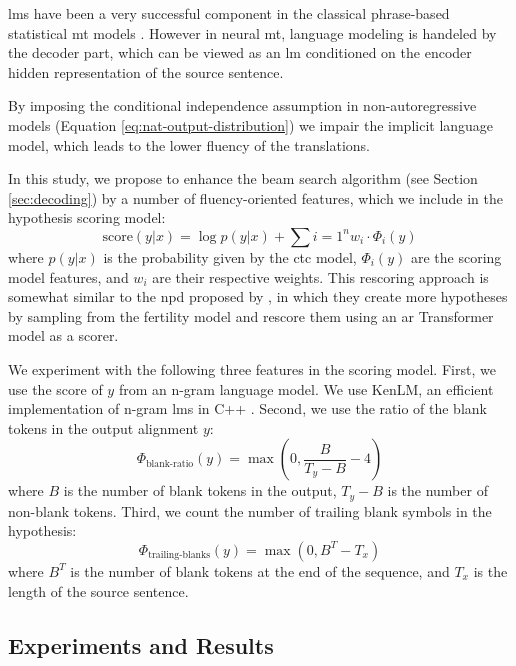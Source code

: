\Acp{lm} have been a very successful component in the classical phrase-based
statistical \acs{mt} models \citep{koehn2009statistical}. However in neural
\acs{mt}, language modeling is handeled by the decoder part, which can be
viewed as an \acs{lm} conditioned on the encoder hidden representation of the
source sentence.

By imposing the conditional independence assumption in non-autoregressive
models (Equation \ref{eq:nat-output-distribution}) we impair the implicit
language model, which leads to the lower fluency of the translations.

In this study, we propose to enhance the beam search algorithm (see Section
\ref{sec:decoding}) by a number of fluency-oriented features, which we include
in the hypothesis scoring model:
%
\begin{equation}
  \text{score}(y|x) = \log p(y|x) + \sum{i=1}^n w_i \cdot \Phi_i(y)
\end{equation}
%
where $p(y|x)$ is the probability given by the \acs{ctc} model, $\Phi_i(y)$ are
the scoring model features, and $w_i$ are their respective weights. This
rescoring approach is somewhat similar to the \ac{npd} proposed by
\citet{gu2017nonautoregressive}, in which they create more hypotheses by
sampling from the fertility model and rescore them using an \ac{ar} Transformer
model as a scorer.

We experiment with the following three features in the scoring model. First, we
use the score of $y$ from an n-gram language model. We use KenLM, an efficient
implementation of n-gram \acp{lm} in C++
\citep{heafield-2011-kenlm}. Second,
we use the ratio of the blank tokens in the output alignment $y$:
%
\begin{equation}
  \Phi_{\text{blank-ratio}}(y) = \max(0, \frac{B}{T_y - B} - 4 )
\end{equation}
%
where $B$ is the number of blank tokens in the output, $T_y - B$ is the number
of non-blank tokens. Third, we count the number of trailing blank symbols in
the hypothesis:
%
\begin{equation}
  \Phi_{\text{trailing-blanks}}(y) = \max(0, B^T - T_x)
\end{equation}
%
where $B^T$ is the number of blank tokens at the end of the sequence, and $T_x$
is the length of the source sentence.

\subsection{Experiments and Results}


